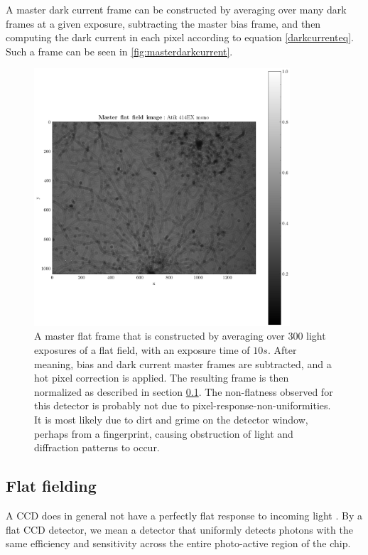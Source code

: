 \documentclass[../main.tex]{subfiles}
\begin{document}
	A master dark current frame can be constructed by averaging over many dark frames at a given exposure, subtracting the master bias frame, and then computing the dark current in each pixel according to equation \ref{darkcurrenteq}. Such a frame can be seen in \ref{fig:masterdarkcurrent}.
	
	\begin{figure}[h!]
		\centering
		\includegraphics[width	=0.85\textwidth]{master_flat.png}
		\caption{A master flat frame that is constructed by averaging over $300$ light exposures of a flat field, with an exposure time of $10s$. After meaning, bias and dark current master frames are subtracted, and a hot pixel correction is applied. The resulting frame is then normalized as described in section \ref{sec:flat}. The non-flatness observed for this detector is probably not due to pixel-response-non-uniformities. It is most likely  due to dirt and grime on the detector window, perhaps from a fingerprint, causing obstruction of light and diffraction patterns to occur.}
		\label{fig:masterflat}
	\end{figure}
	\subsection{Flat fielding}\label{sec:flat}
	A CCD does in general not have a perfectly flat response to incoming light \cite{CCDdatareductionguide, handbookofccdastronomy}. By a flat CCD detector, we mean a detector that uniformly detects photons with the same efficiency and sensitivity across the entire photo-active region of the chip. 
	
\end{document}
